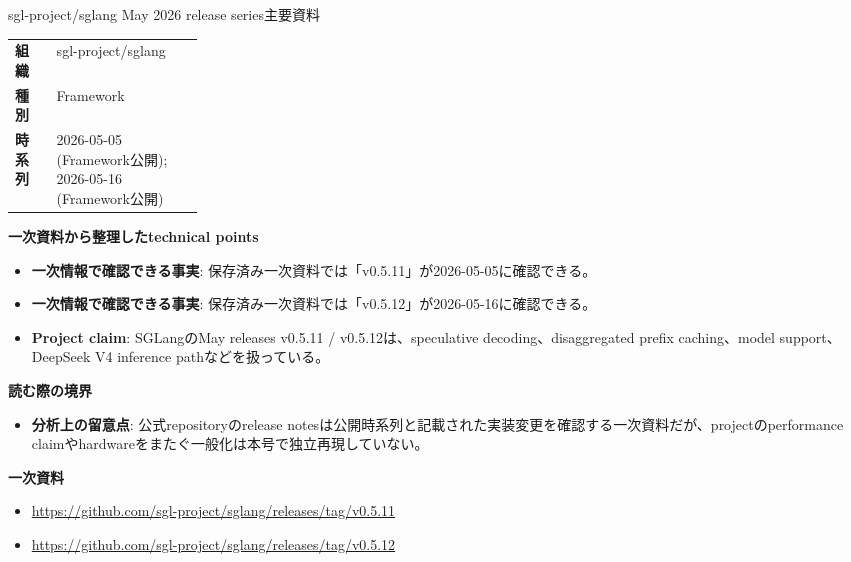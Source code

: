 \begin{technicalnote}{sgl-project/sglang May 2026 release series}{主要資料}
\begingroup
\begin{tabularx}{\linewidth}{@{}>{\bfseries}p{0.22\linewidth}X@{}}
組織 & sgl-project/sglang \\
種別 & Framework \\
時系列 & 2026-05-05 (Framework公開); 2026-05-16 (Framework公開) \\
\end{tabularx}
\smallskip
{\bfseries 一次資料から整理したtechnical points}
\begin{itemize}[leftmargin=1.5em,itemsep=0.35em]
\item \textbf{一次情報で確認できる事実}: 保存済み一次資料では「v0.5.11」が2026-05-05に確認できる。
\item \textbf{一次情報で確認できる事実}: 保存済み一次資料では「v0.5.12」が2026-05-16に確認できる。
\item \textbf{Project claim}: SGLangのMay releases v0.5.11 / v0.5.12は、speculative decoding、disaggregated prefix caching、model support、DeepSeek V4 inference pathなどを扱っている。
\end{itemize}
{\bfseries 読む際の境界}
\begin{itemize}[leftmargin=1.5em,itemsep=0.35em]
\item \textbf{分析上の留意点}: 公式repositoryのrelease notesは公開時系列と記載された実装変更を確認する一次資料だが、projectのperformance claimやhardwareをまたぐ一般化は本号で独立再現していない。
\end{itemize}
\begin{samepage}
{\bfseries 一次資料}
\begingroup\sloppy
\begin{itemize}[leftmargin=1.5em,itemsep=0.25em]
\item {\scriptsize\url{https://github.com/sgl-project/sglang/releases/tag/v0.5.11}}
\item {\scriptsize\url{https://github.com/sgl-project/sglang/releases/tag/v0.5.12}}
\end{itemize}
\endgroup
\end{samepage}
\endgroup
\end{technicalnote}
\medskip

